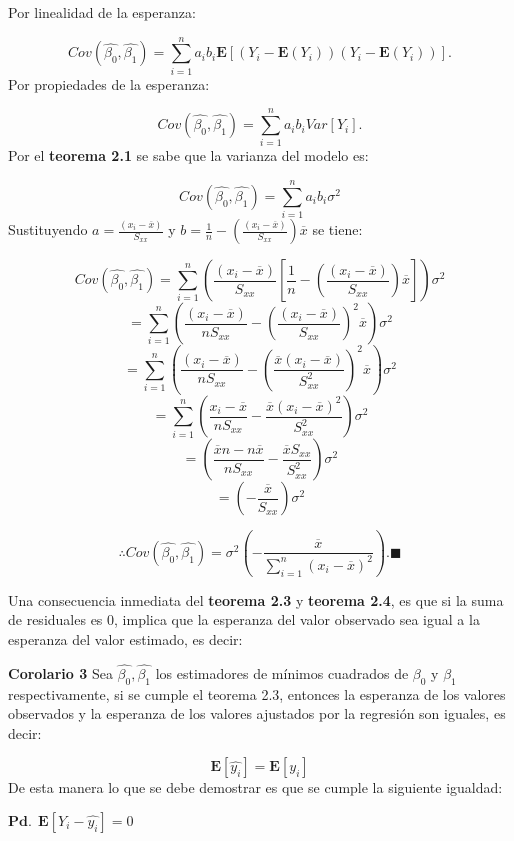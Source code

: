 \documentclass[
  a4paper,
  oneside,
  openany]{book}
\begin{document}
Por linealidad de la esperanza:

\[Cov\left(\hat{\beta_{0}},\hat{\beta_{1}}\right)=\sum_{i=1}^{n}a_{i}b_{i}\mathbf{E}[(Y_{i}-\mathbf{E}(Y_{i}))(Y_{i}-\mathbf{E}(Y_{i}))].\]
Por propiedades de la esperanza:

\[Cov\left(\hat{\beta_{0}},\hat{\beta_{1}}\right)=\sum_{i=1}^{n}a_{i}b_{i}Var[Y_{i}].\]
Por el \textbf{teorema 2.1} se sabe que la varianza del modelo es:

\[Cov\left(\hat{\beta_{0}},\hat{\beta_{1}}\right)=\sum_{i=1}^{n}a_{i}b_{i}\sigma^2\]
Sustituyendo \(a=\frac{(x_{i}-\overline{x})}{S_{xx}}\) y \(b=\frac{1}{n}-\left(\frac{(x_{i}-\overline{x})}{S_{xx}}\right)\overline{x}\) se tiene:

\[Cov\left(\hat{\beta_{0}},\hat{\beta_{1}}\right)=\sum_{i=1}^{n}\left(\frac{(x_{i}-\overline{x})}{S_{xx}}\left[\frac{1}{n}-\left(\frac{(x_{i}-\overline{x})}{S_{xx}}\right)\overline{x}\right]\right)\sigma^2\]
\[=\sum_{i=1}^{n}\left(\frac{(x_{i}-\overline{x})}{nS_{xx}}-\left(\frac{(x_{i}-\overline{x})}{S_{xx}}\right)^2\overline{x}\right)\sigma^2\]
\[=\sum_{i=1}^{n}\left(\frac{(x_{i}-\overline{x})}{nS_{xx}}-\left(\frac{\overline{x}(x_{i}-\overline{x})}{S^2_{xx}}\right)^2\overline{x}\right)\sigma^2\]
\[=\sum_{i=1}^{n}\left(\frac{x_{i}-\overline{x}}{nS_{xx}}-\frac{\overline{x}(x_{i}-\overline{x})^2}{S^2_{xx}}\right)\sigma^2\]
\[=\left(\frac{\overline{x}n -n\overline{x}}{nS_{xx}}-\frac{\overline{x}S_{xx}}{S^2_{xx}}\right)\sigma^2\]
\[=\left(-\frac{\overline{x}}{S_{xx}}\right)\sigma^2\]

\[\therefore Cov\left(\hat{\beta_{0}},\hat{\beta_{1}}\right)=\sigma^2\left(-\frac{\overline{x}}{\sum_{i=1}^{n}(x_{i}-\overline{x})^2}\right).\blacksquare\]

Una consecuencia inmediata del \textbf{teorema 2.3} y \textbf{teorema 2.4}, es que si la suma de residuales es 0, implica que la esperanza del valor observado sea igual a la esperanza del valor estimado, es decir:

\textbf{Corolario 3} Sea \(\hat{\beta_{0}},\hat{\beta_{1}}\) los estimadores de mínimos cuadrados de \(\beta_{0}\) y \(\beta_{1}\) respectivamente, si se cumple el teorema 2.3, entonces la esperanza de los valores observados y la esperanza de los valores ajustados por la regresión son iguales, es decir:

\[\mathbf{E}\left[\hat{y_{i}}\right]=\mathbf{E}\left[ y_{i} \right]\]
De esta manera lo que se debe demostrar es que se cumple la siguiente igualdad:

\(\mathbf{Pd.} \ \ \mathbf{E}\left[ Y_{i}-\hat{y_{i}}\right]=0\)
\end{document}
